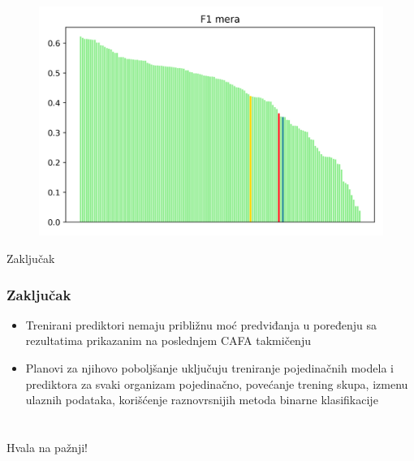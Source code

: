 \documentclass{beamer}
\begin{document}
\begin{frame}
	\begin{figure}
		\includegraphics[width=\textwidth]{../Tekst/Figures/cafa_poredjenje.png}
	\end{figure}
	
\end{frame}



\begin{frame}{Zaključak}
	\frametitle{Zaključak}
	\begin{itemize}
		\item Trenirani prediktori nemaju približnu moć predviđanja u poređenju sa rezultatima prikazanim na poslednjem CAFA takmičenju
		
		\item Planovi za njihovo poboljšanje uključuju treniranje pojedinačnih modela i prediktora za svaki organizam pojedinačno, povećanje trening skupa, izmenu ulaznih podataka, korišćenje raznovrsnijih metoda binarne klasifikacije
		
	\end{itemize}
	
\end{frame}


\section{}
\begin{frame}
	\centering \Large Hvala na pažnji!
\end{frame}
\end{document}
